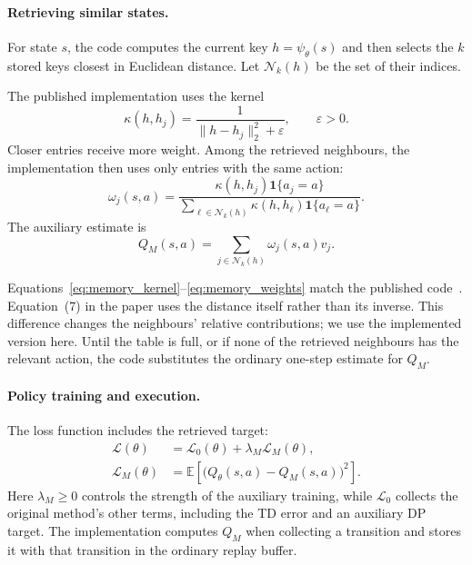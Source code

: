 \documentclass[9pt,a4paper,twocolumn]{extarticle}
\begin{document}
\paragraph{Retrieving similar states.}

For state $s$, the code computes the current key $h=\psi_\theta(s)$ and then selects the $k$
stored keys closest in Euclidean distance. Let $\mathcal N_k(h)$ be the set of their indices.

The published implementation uses the kernel
\begin{equation}
  \kappa(h,h_j)
  =
  \frac{1}{\|h-h_j\|_2^2+\varepsilon},
  \qquad \varepsilon>0.
  \label{eq:memory_kernel}
\end{equation}
Closer entries receive more weight. Among the retrieved neighbours, the implementation then uses
only entries with the same action:
\begin{equation}
  \omega_j(s,a)
  =
  \frac{
    \kappa(h,h_j)\mathbf 1\{a_j=a\}
  }{
    \displaystyle
    \sum_{\ell\in\mathcal N_k(h)}
    \kappa(h,h_\ell)\mathbf 1\{a_\ell=a\}
  }.
  \label{eq:memory_weights}
\end{equation}
The auxiliary estimate is
\begin{equation}
  Q_M(s,a)
  =
  \sum_{j\in\mathcal N_k(h)}
  \omega_j(s,a)v_j.
  \label{eq:memory_estimate}
\end{equation}

Equations~\eqref{eq:memory_kernel}--\eqref{eq:memory_weights} match the published
code~\cite{macrohftcode}. Equation~(7) in the paper uses the distance itself rather than its
inverse. This difference changes the neighbours' relative contributions; we use the implemented
version here. Until the table is full, or if none of the retrieved neighbours has the relevant
action, the code substitutes the ordinary one-step estimate for $Q_M$.

\paragraph{Policy training and execution.}

The loss function includes the retrieved target:
\begin{equation}
  \begin{aligned}
    \mathcal L(\theta)
    &=
    \mathcal L_0(\theta)
    +\lambda_M\mathcal L_M(\theta),\\
    \mathcal L_M(\theta)
    &=
    \mathbb E\left[
      \bigl(Q_\theta(s,a)-Q_M(s,a)\bigr)^2
    \right].
  \end{aligned}
  \label{eq:memory_loss}
\end{equation}
Here $\lambda_M\geq0$ controls the strength of the auxiliary training, while $\mathcal L_0$
collects the original method's other terms, including the TD error and an auxiliary DP target.
The implementation computes $Q_M$ when collecting a transition and stores it with that transition
in the ordinary replay buffer.
\end{document}
